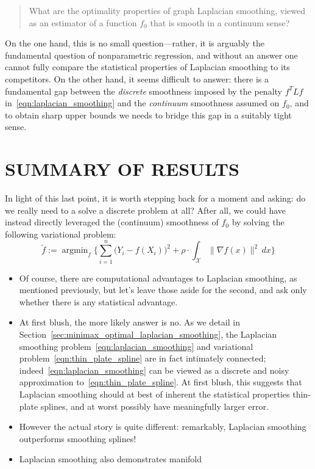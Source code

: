\documentclass[twoside]{article}
\newcommand{\1}{\mathbf{1}}
\DeclareMathOperator*{\argmin}{argmin}
\newcommand{\Lap}{L}
\newcommand{\Xset}{\mathcal{X}}
\newcommand{\wt}[1]{\widetilde{#1}}
\theoremstyle{definition}
\theoremstyle{remark}
\begin{document}
\begin{quote}{What are the optimality properties of graph Laplacian smoothing, viewed as an estimator of a function $f_0$ that is smooth in a continuum sense?} 
\end{quote}
On the one hand, this is no small question---rather, it is arguably the fundamental question of nonparametric regression, and without an answer one cannot fully compare the statistical properties of Laplacian smoothing to its competitors. On the other hand, it seems difficult to answer: there is a fundamental gap between the \emph{discrete} smoothness imposed by the penalty $f^T \Lap f$ in~\eqref{eqn:laplacian_smoothing} and the \emph{continuum} smoothness assumed on $f_0$, and to obtain sharp upper bounds we needs to bridge this gap in a suitably tight sense.

\section{SUMMARY OF RESULTS}
In light of this last point, it is worth stepping back for a moment and asking: do we really need to a solve a discrete problem at all? After all, we could have instead directly leveraged the (continuum) smoothness of $f_0$ by solving the following variational problem:
\begin{equation}
\label{eqn:thin_plate_spline}
\wt{f} := \argmin_{f} \biggl\{\sum_{i = 1}^{n} \bigl(Y_i - f(X_i)\bigr)^2 + \rho \cdot \int_{\Xset} \|\nabla f(x)\|^2 \,dx \biggr\}
\end{equation}

\begin{itemize}
	\item 
	Of course, there are computational advantages to Laplacian smoothing, as mentioned previously, but let's leave those aside for the second, and ask only whether there is any statistical advantage.
	\item At first blush, the more likely answer is no. As we detail in Section~\ref{sec:minimax_optimal_laplacian_smoothing}, the Laplacian smoothing problem~\eqref{eqn:laplacian_smoothing} and variational problem~\eqref{eqn:thin_plate_spline} are in fact intimately connected; indeed~\eqref{eqn:laplacian_smoothing} can be viewed as a discrete and noisy approximation to~\eqref{eqn:thin_plate_spline}. At first blush, this suggests that Laplacian smoothing should at best of inherent the statistical properties thin-plate splines, and at worst possibly have meaningfully larger error.
	\item However the actual story is quite different: remarkably, Laplacian smoothing outperforms smoothing splines! 
	\item Laplacian smoothing also demonstrates manifold 
\end{itemize}
\end{document}
